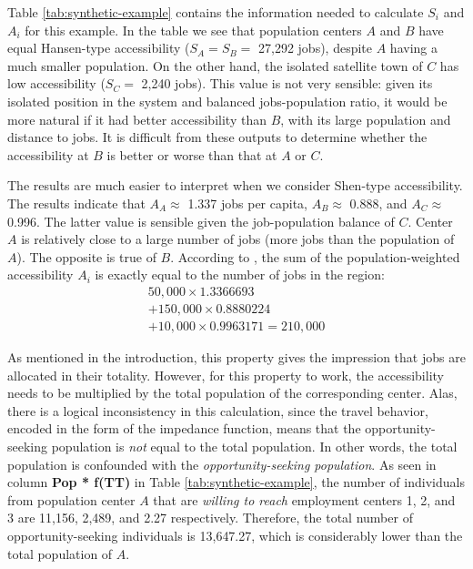 \documentclass[]{elsarticle} %
\begin{document}
\begin{table}[ht]
\end{table}
 

Table \ref{tab:synthetic-example} contains the information needed to
calculate \(S_i\) and \(A_i\) for this example. In the table we see that
population centers \(A\) and \(B\) have equal Hansen-type accessibility
(\(S_A = S_B=\) 27,292 jobs), despite \(A\) having a much smaller
population. On the other hand, the isolated satellite town of \(C\) has
low accessibility (\(S_C=\) 2,240 jobs). This value is not very
sensible: given its isolated position in the system and balanced
jobs-population ratio, it would be more natural if it had better
accessibility than \(B\), with its large population and distance to
jobs. It is difficult from these outputs to determine whether the
accessibility at \(B\) is better or worse than that at \(A\) or \(C\).

The results are much easier to interpret when we consider Shen-type
accessibility. The results indicate that \(A_A \approx\) 1.337 jobs per
capita, \(A_B \approx\) 0.888, and \(A_C\approx\) 0.996. The latter
value is sensible given the job-population balance of \(C\). Center
\(A\) is relatively close to a large number of jobs (more jobs than the
population of \(A\)). The opposite is true of \(B\). According to
\citet{shen1998}, the sum of the population-weighted accessibility
\(A_i\) is exactly equal to the number of jobs in the region: \[
\begin{array}{l}
50,000\times 1.3366693 \\
+ 150,000 \times 0.8880224 \\
+ 10,000 \times 0.9963171 = 210,000
\end{array}
\]

As mentioned in the introduction, this property gives the impression
that jobs are allocated in their totality. However, for this property to
work, the accessibility needs to be multiplied by the total population
of the corresponding center. Alas, there is a logical inconsistency in
this calculation, since the travel behavior, encoded in the form of the
impedance function, means that the opportunity-seeking population is
\emph{not} equal to the total population. In other words, the total
population is confounded with the \emph{opportunity-seeking population}.
As seen in column \textbf{Pop * f(TT)} in Table
\ref{tab:synthetic-example}, the number of individuals from population
center \(A\) that are \emph{willing to reach} employment centers 1, 2,
and 3 are 11,156, 2,489, and 2.27 respectively. Therefore, the total
number of opportunity-seeking individuals is 13,647.27, which is
considerably lower than the total population of \(A\).
\end{document}
